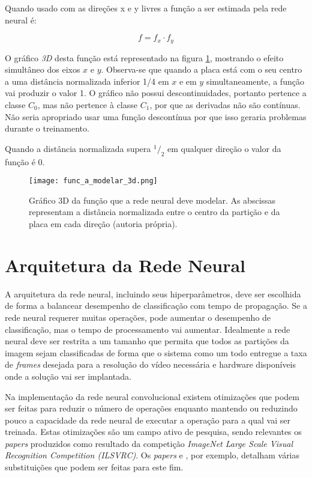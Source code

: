 Quando usado com as direções x e y livres a função a ser estimada pela rede
neural é:

\begin{equation} \label{eq:funcao_a_modelar}
	f=f_x \cdot f_y
\end{equation}

O gráfico \emph{3D} desta função está representado na figura
\ref{fig:func_a_modelar_3d}, mostrando o
efeito simultâneo dos eixos $x$ e $y$.  Observa-se que quando a placa
está com o seu centro a uma distância normalizada inferior 1/4 em $x$ e em $y$
simultaneamente, a função vai produzir o valor 1. O gráfico não possui
descontinuidades, portanto pertence a classe $C_0$, mas não pertence à classe
$C_1$, por que as derivadas não são contínuas. Não seria apropriado usar uma
função descontínua por que isso geraria problemas durante o treinamento.

Quando a distância
normalizada supera $^1/_2$ em qualquer direção o valor da função é 0.

\begin{figure}[!htb]
	\centering
	\texttt{[image: func\_a\_modelar\_3d.png]}
	\caption[Gráfico 3D da função à modelar]{
		Gráfico 3D da função
		que a rede neural deve modelar. As abscissas representam
		a distância normalizada entre o centro da partição e da placa em cada
		direção (autoria própria).}
	\label{fig:func_a_modelar_3d}
\end{figure}


\section{Arquitetura da Rede Neural}

A arquitetura da rede neural, incluindo seus hiperparâmetros, deve ser
escolhida de forma a balancear desempenho de classificação com tempo de
propagação. Se a rede neural requerer muitas operações, pode aumentar o
desempenho de classificação, mas o tempo de processamento vai aumentar.
Idealmente a rede neural deve ser restrita a um tamanho que permita que todos
as partições da imagem sejam classificadas de forma que o sistema como um todo
entregue a taxa de \emph{frames} desejada para a resolução do vídeo necessária
e hardware disponíveis onde a solução vai ser implantada.

Na implementação da rede neural convolucional existem otimizações que podem ser
feitas para reduzir o número de operações enquanto mantendo ou reduzindo pouco
a capacidade da rede neural de executar a operação para a qual vai ser
treinada. Estas otimizações são um campo ativo de pesquisa, sendo relevantes os
\emph{papers} produzidos como resultado da competição \emph{ImageNet Large
Scale Visual Recognition Competition (ILSVRC)}. Os \emph{papers}
\cite{szegedy2015going} e \cite{szegedy2015rethinking},
por exemplo, detalham várias substituições que podem ser feitas para este fim.


